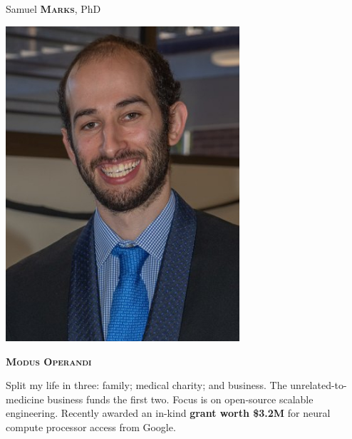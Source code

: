 \documentclass[11pt, a4paper]{article}
\newcommand{\headleft}[1]{\vspace*{3ex}\textsc{\textbf{#1}}\par%
    \vspace*{-1.5ex}\hrulefill\par\vspace*{0.7ex}}
\begin{document}
\setlength{\topskip}{0pt}
\setlength{\parindent}{0pt}
\setlength{\parskip}{0pt}
\setlength{\fboxsep}{0pt}
\pagestyle{empty}
\raggedbottom

\begin{minipage}[t]{0.33\textwidth} %
\colorbox{cvblue}{\begin{minipage}[t][5mm][t]{\textwidth}\null\hfill\null\end{minipage}}

\vspace{-.2ex} %
\colorbox{cvblue!90}{\color{white}  %
\textwidth\relax%
\begin{minipage}[t][293mm][t]{0.82\textwidth}
\raggedright
\vspace*{2.5ex}

\Large Samuel \textbf{\textsc{Marks}}, PhD \normalsize 

\null\hfill\includegraphics[width=0.65\textwidth]{images/user.jpg}\hfill\null

\vspace*{0.5ex} %

\headleft{Modus Operandi}
Split my life in three: family; medical charity; and business. The unrelated-to-medicine business funds the first two. Focus is on open-source scalable engineering. Recently awarded an in-kind \textbf{grant worth \$3.2M} for neural compute processor access from Google.


\end{minipage}}
\end{minipage}
\end{document}
